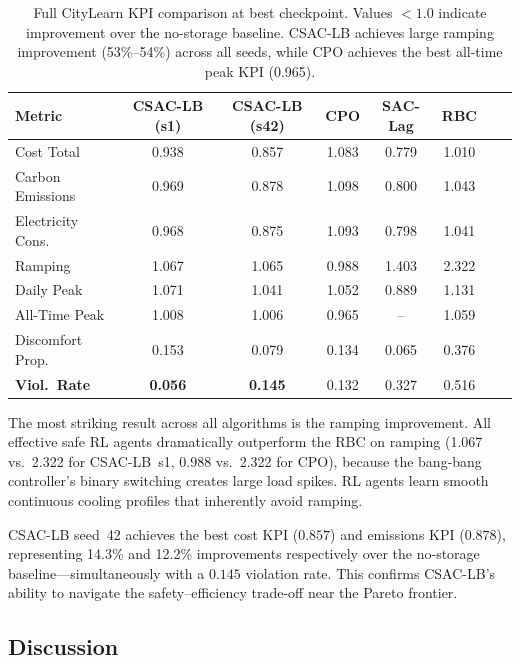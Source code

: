 \begin{table}[htbp]
\centering
\caption{Full CityLearn KPI comparison at best checkpoint.
  Values $<1.0$ indicate improvement over the no-storage baseline.
  CSAC-LB achieves large ramping improvement (53\%--54\%) across all
  seeds, while CPO achieves the best all-time peak KPI (0.965).}
\label{tab:citylearn-kpi}
\begin{tabular}{lccccccc}
\toprule
\textbf{Metric} &
  \textbf{CSAC-LB (s1)} &
  \textbf{CSAC-LB (s42)} &
  \textbf{CPO} &
  \textbf{SAC-Lag} &
  \textbf{RBC} \\
\midrule
Cost Total            & 0.938 & 0.857 & 1.083 & 0.779 & 1.010 \\
Carbon Emissions      & 0.969 & 0.878 & 1.098 & 0.800 & 1.043 \\
Electricity Cons.     & 0.968 & 0.875 & 1.093 & 0.798 & 1.041 \\
Ramping               & 1.067 & 1.065 & 0.988 & 1.403 & 2.322 \\
Daily Peak            & 1.071 & 1.041 & 1.052 & 0.889 & 1.131 \\
All-Time Peak         & 1.008 & 1.006 & 0.965 & --    & 1.059 \\
Discomfort Prop.      & 0.153 & 0.079 & 0.134 & 0.065 & 0.376 \\
\textbf{Viol.\ Rate}  & \textbf{0.056} & \textbf{0.145} & 0.132 & 0.327 & 0.516 \\
\bottomrule
\end{tabular}
\end{table}

The most striking result across all algorithms is the ramping improvement.
All effective safe RL agents dramatically outperform the RBC on ramping
(1.067 vs.\ 2.322 for CSAC-LB~s1, 0.988 vs.\ 2.322 for CPO), because the
bang-bang controller's binary switching creates large load spikes.  RL agents
learn smooth continuous cooling profiles that inherently avoid ramping.

CSAC-LB seed~42 achieves the best cost KPI ($0.857$) and emissions KPI
($0.878$), representing 14.3\% and 12.2\% improvements respectively over
the no-storage baseline---simultaneously with a $0.145$ violation rate.  This
confirms CSAC-LB's ability to navigate the safety--efficiency trade-off near
the Pareto frontier.


\subsection{Discussion}
\label{sec:temp-discussion}

